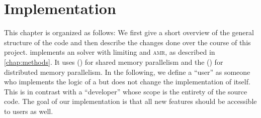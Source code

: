 \chapter{Implementation}\label{chap:implementation}
This chapter is organized as follows:
We first give a short overview of the general structure of the \exahype{} code and then describe the changes done over the course of this project.
\exahype{} implements an \aderdg{} solver with \muscl{} limiting and \textsc{amr}, as described in \cref{chap:methods}.
It uses  (\tbb{}) for shared memory parallelism and the  (\mpi{}) for distributed memory parallelism. 
In the following, we define a \enquote{user} as someone who implements the logic of a \pde{} but does not change the implementation of \exahype{} itself.
This is in contrast with a \enquote{developer} whose scope is the entirety of the source code.
The goal of our implementation is that all new features should be accessible to users as well.

